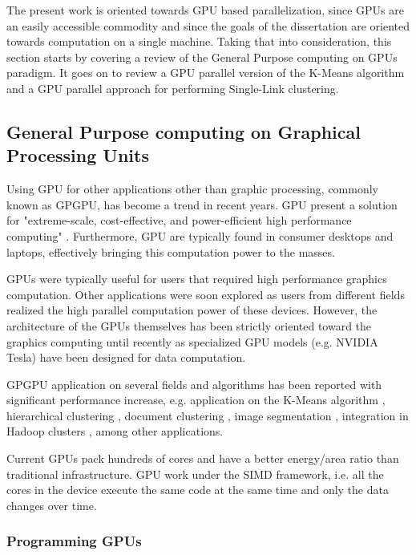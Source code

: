 The present work is oriented towards GPU based parallelization, since GPUs are an easily accessible commodity and since the goals of the dissertation are oriented towards computation on a single machine.
Taking that into consideration, this section starts by covering a review of the General Purpose computing on GPUs paradigm.
It goes on to review a GPU parallel version of the K-Means algorithm and a GPU parallel approach for performing Single-Link clustering.

\subsection{General Purpose computing on Graphical Processing Units}
\label{sec:gpgpu}

Using GPU for other applications other than graphic processing, commonly known as GPGPU, has become a trend in recent years.
GPU present a solution for "extreme-scale, cost-effective, and power-efficient high performance computing" \cite{Chen2012}.
Furthermore, GPU are typically found in consumer desktops and laptops, effectively bringing this computation power to the masses.

GPUs were typically useful for users that required high performance graphics computation.
Other applications were soon explored as users from different fields realized the high parallel computation power of these devices.
However, the architecture of the GPUs themselves has been strictly oriented toward the graphics computing until recently as specialized GPU models (e.g. NVIDIA Tesla) have been designed for data computation.

GPGPU application on several fields and algorithms has been reported with significant performance increase, e.g. application on the K-Means algorithm \cite{Bai2009,Wu2011,Zechner2009,Wu2009a}, hierarchical clustering \cite{Shalom2009,ArulShalom2011}, document clustering \cite{gao20xx}, image segmentation \cite{Sirotkovi2012}, integration in Hadoop clusters \cite{Malakar2013,Grossman2013}, among other applications.

Current GPUs pack hundreds of cores and have a better energy/area ratio than traditional infrastructure.
GPU work under the SIMD framework, i.e. all the cores in the device execute the same code at the same time and only the data changes over time.

\subsubsection{Programming GPUs}

